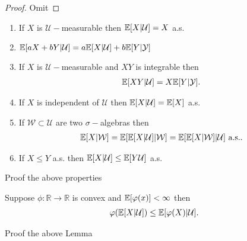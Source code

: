\begin{proof}
 Omit 
\end{proof}
\begin{theorem}
 \begin{enumerate}
   \item If $X$ is $\mathcal{U}-$measurable then $\mathbb{E}[X|\mathcal{U}] = X$ a.s.
   \item $\mathbb{E}[aX + bY|\mathcal{U}] = a\mathbb{E}[X|\mathcal{U}] + b \mathbb{E}[Y|\mathcal{Y}]$
   \item If $X$ is $\mathcal{U}-$measurable and $XY$ is integrable then 
     \begin{align*}
       \mathbb{E}[XY|\mathcal{U}] = X \mathbb{E}[Y|\mathcal{Y}]
     .\end{align*}
   \item If $X$ is independent of $\mathcal{U}$ then $\mathbb{E}[X|\mathcal{U}] = \mathbb{E}[X]$ a.s.
   \item If $\mathcal{W} \subset  \mathcal{U}$ are two $\sigma-$algebras then 
     \begin{align*}
       \mathbb{E}[X|\mathcal{W}] = \mathbb{E}[\mathbb{E}[X|\mathcal{U}]|\mathcal{W}] = \mathbb{E}[\mathbb{E}[X|\mathcal{W}]|\mathcal{U}] \text{ a.s.}
     .\end{align*}
   \item If $X\le Y$ a.s. then $\mathbb{E}[X|\mathcal{U}] \le \mathbb{E}[Y\mathcal{U}]$  a.s.
 \end{enumerate} 
\end{theorem}
\begin{exercise}
 Proof the above properties  
\end{exercise}
\begin{lemma}
  Suppose $\phi  : \mathbb{R}\to \mathbb{R}$ is convex and $\mathbb{E}[\varphi(x)] < \infty$ then
  \begin{align*}
    \varphi(\mathbb{E}[X|\mathcal{U}]) \le \mathbb{E}[\varphi(X)|\mathcal{U}]
  .\end{align*} 
\end{lemma}
\begin{exercise}
 Proof the above Lemma 
\end{exercise}
